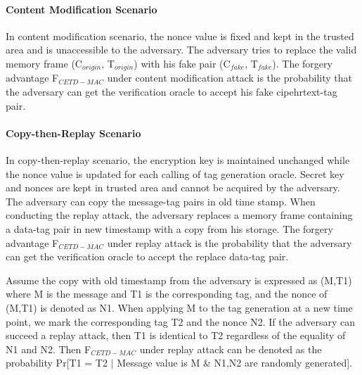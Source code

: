 \documentclass{article}
\begin{document}
\paragraph{Content Modification Scenario}
In content modification scenario, the nonce value is fixed and kept in the trusted area and is unaccessible to the adversary. The adversary tries to replace the valid memory frame (C$_{origin}$, T$_{origin}$) with his fake pair (C$_{fake}$, T$_{fake}$). The forgery advantage F$_{CETD-MAC}$ under content modification attack is the probability that the adversary can get the verification oracle to accept his fake cipehrtext-tag pair. 
\paragraph{Copy-then-Replay Scenario}
In copy-then-replay scenario, the encryption key is maintained unchanged while the nonce value is updated for each calling of tag generation oracle. Secret key and nonces are kept in trusted area and cannot be acquired by the adversary. The adversary can copy the message-tag pairs in old time stamp. When conducting the replay attack, the adversary replaces a memory frame containing a data-tag pair in new timestamp with a copy from his storage. The forgery advantage F$_{CETD-MAC}$ under replay attack is the probability that the adversary can get the verification oracle to accept the replace data-tag pair.  

Assume the copy with old timestamp from the adversary is expressed as (M,T1) where M is the message and T1 is the corresponding tag, and the nonce of (M,T1) is denoted as N1. When applying M to the tag generation at a new time point, we mark the corresponding tag T2 and the nonce N2. If the adversary can succeed a replay attack, then T1 is identical to T2 regardless of the equality of N1 and N2.
Then F$_{CETD-MAC}$ under replay attack can be denoted as the probability Pr[T1 = T2 $\mid$ Message value is M \& N1,N2 are randomly generated]. 
\end{document}

